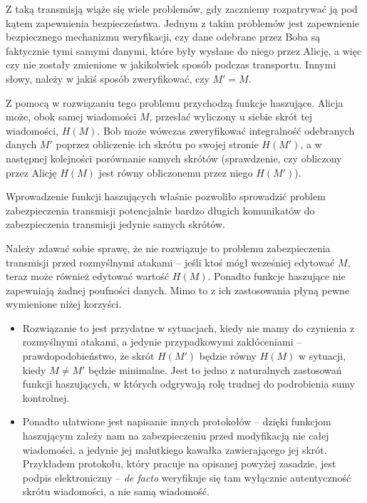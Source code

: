 \documentclass[12pt,a4paper,twoside]{article}
\begin{document}

Z taką transmisją wiąże się wiele problemów, gdy zaczniemy rozpatrywać ją pod
kątem zapewnienia bezpieczeństwa. Jednym z takim problemów jest zapewnienie
bezpiecznego mechanizmu weryfikacji, czy dane odebrane przez Boba są faktycznie
tymi samymi danymi, które były wysłane do niego przez Alicję, a więc czy nie
zostały zmienione w jakikolwiek sposób podczas transportu. Innymi słowy, należy
w jakiś sposób zweryfikować, czy $M' = M$.

Z pomocą w rozwiązaniu tego problemu przychodzą funkcje haszujące. Alicja może,
obok samej wiadomości $M$, przesłać wyliczony u siebie skrót tej wiadomości,
$H(M)$.  Bob może wówczas zweryfikować integralność odebranych danych $M'$
poprzez obliczenie ich skrótu po swojej stronie $H(M')$, a w następnej
kolejności porównanie samych skrótów (sprawdzenie, czy obliczony przez Alicję
$H(M)$ jest równy obliczonemu przez niego $H(M')$).

Wprowadzenie funkcji haszujących właśnie pozwoliło sprowadzić problem
zabezpieczenia transmisji potencjalnie bardzo długich komunikatów do
zabezpieczenia transmisji jedynie samych skrótów.

Należy zdawać sobie sprawę, że nie rozwiązuje to problemu zabezpieczenia
transmisji przed rozmyślnymi atakami -- jeśli ktoś mógł wcześniej edytować $M$,
teraz może również edytować wartość $H(M)$. Ponadto funkcje haszujące nie
zapewniają żadnej poufności danych. Mimo to z ich zastosowania płyną pewne
wymienione niżej korzyści.

\begin{itemize}
\item Rozwiązanie to jest przydatne w sytuacjach, kiedy nie mamy do czynienia z
rozmyślnymi atakami, a jedynie przypadkowymi zakłóceniami --
prawdopodobieństwo, że skrót $H(M')$ będzie równy $H(M)$ w sytuacji, kiedy $M
\neq M'$ będzie minimalne. Jest to jedno z naturalnych zastosowań funkcji
haszujących, w których odgrywają rolę trudnej do podrobienia sumy kontrolnej.
\item Ponadto ułatwione jest napisanie innych protokołów -- dzięki funkcjom
haszującym zależy nam na zabezpieczeniu przed modyfikacją nie całej wiadomości,
a jedynie jej malutkiego kawałka zawierającego jej skrót.  Przykładem
protokołu, który pracuje na opisanej powyżej zasadzie, jest podpis
elektroniczny -- \emph{de facto} weryfikuje się tam wyłącznie autentyczność
skrótu wiadomości, a nie samą wiadomość.
\end{itemize}
\end{document}
